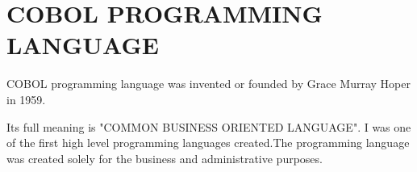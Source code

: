 \documentclass{article}
\begin{document}
	\section*{COBOL PROGRAMMING LANGUAGE}
	COBOL programming language was invented or founded by Grace Murray Hoper in 1959.
	
	Its full meaning is "COMMON BUSINESS ORIENTED LANGUAGE".
	I was one of the first high level programming languages created.The programming language was created solely for the business and administrative purposes.
	
\end{document}
